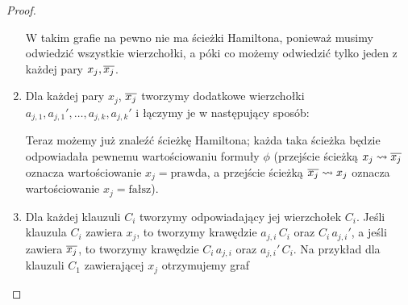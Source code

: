 \begin{proof}
\begin{enumerate}
        W takim grafie na pewno nie ma ścieżki Hamiltona, ponieważ musimy odwiedzić wszystkie wierzchołki, a póki co możemy odwiedzić tylko jeden z każdej pary $x_j, \overline{x_j}$.

        \item Dla każdej pary $x_j$, $\overline{x_j}$ tworzymy dodatkowe wierzchołki $a_{j, 1}, a_{j, 1}', \ldots, a_{j, k}, a_{j, k}'$ i łączymy je w następujący sposób:
        \begin{figure}[H]
            \centering
        \end{figure}

        Teraz możemy już znaleźć ścieżkę Hamiltona; każda taka ścieżka będzie odpowiadała pewnemu wartościowaniu formuły $\phi$ (przejście ścieżką $x_j \rightsquigarrow \overline{x_j}$ oznacza wartościowanie $x_j = \text{prawda}$, a przejście ścieżką $\overline{x_j} \rightsquigarrow x_j$ oznacza wartościowanie $x_j = \text{fałsz}$).

        \item Dla każdej klauzuli $C_i$ tworzymy odpowiadający jej wierzchołek $C_i$. Jeśli klauzula $C_i$ zawiera $x_j$, to tworzymy krawędzie $a_{j, i}\,C_i$ oraz $C_i\,a_{j, i}'$, a jeśli zawiera $\overline{x_j}$, to tworzymy krawędzie $C_i\,a_{j, i}$ oraz $a_{j, i}'\,C_i$. Na przykład dla klauzuli $C_1$ zawierającej $x_j$ otrzymujemy graf
        \begin{figure}[H]
            \centering
\end{figure}
\end{enumerate}
\end{proof}
